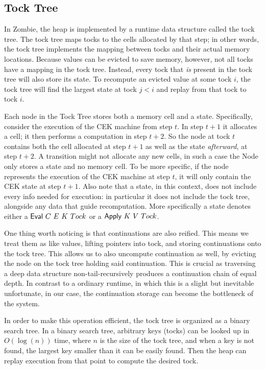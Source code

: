 \subsection{Tock Tree}
In Zombie, the heap is implemented by a runtime data structure called the tock tree. The tock tree maps tocks to the cells allocated by that step; in other words, the tock tree implements the mapping between tocks and their actual memory locations. Because values can be evicted to save memory, however, not all tocks have a mapping in the tock tree. Instead, every tock that \emph{is} present in the tock tree will also store its state. To recompute an evicted value at some tock $i$, the tock tree will find the largest state at tock $j < i$ and replay from that tock to tock $i$.

Each node in the Tock Tree stores both a memory cell and a state. Specifically, consider the execution of the CEK machine from step $t$. In step $t + 1$ it allocates a cell; it then performs a computation in step $t + 2$. So the node at tock $t$ contains both the cell allocated at step $t + 1$ as well as the state \emph{afterward}, at step $t + 2$. A transition might not allocate any new cells, in such a case the Node only stores a state and no memory cell. To be more specific, if the node represents the execution of the CEK machine at step $t$, it will only contain the CEK state at step $t + 1$. Also note that a state, in this context, does not include every info needed for execution: in particular it does not include the tock tree, alongside any data that guide recomputation. More specifically a state denotes either a $\text{\textsf{Eval}}~C~E~K~Tock$ or a $\text{\textsf{Apply}}~K~V~Tock$.

One thing worth noticing is that continuations are also reified. This means we treat them as like values, lifting pointers into tock, and storing continuations onto the tock tree. This allows us to also uncompute continuation as well, by evicting the node on the tock tree holding said continuation. This is crucial as traversing a deep data structure non-tail-recursively produces a continuation chain of equal depth. In contrast to a ordinary runtime, in which this is a slight but inevitable unfortunate, in our case, the continuation storage can become the bottleneck of the system.

In order to make this operation efficient, the tock tree is organized as a binary search tree. In a binary search tree, arbitrary keys (tocks) can be looked up in $O(\log(n))$ time, where $n$ is the size of the tock tree, and when a key is not found, the largest key smaller than it can be easily found. Then the heap can replay execution from that point to compute the desired tock.

